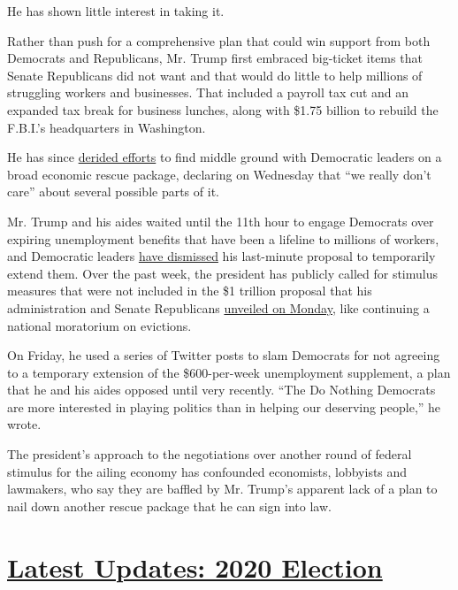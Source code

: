 He has shown little interest in taking it.

Rather than push for a comprehensive plan that could win support from
both Democrats and Republicans, Mr. Trump first embraced big-ticket
items that Senate Republicans did not want and that would do little to
help millions of struggling workers and businesses. That included a
payroll tax cut and an expanded tax break for business lunches, along
with \$1.75 billion to rebuild the F.B.I.'s headquarters in Washington.

He has since
\href{https://www.nytimes.com/2020/07/29/business/economy/virus-aid-trump.html?referringSource=articleShare}{derided
efforts} to find middle ground with Democratic leaders on a broad
economic rescue package, declaring on Wednesday that ``we really don't
care'' about several possible parts of it.

Mr. Trump and his aides waited until the 11th hour to engage Democrats
over expiring unemployment benefits that have been a lifeline to
millions of workers, and Democratic leaders
\href{https://www.nytimes.com/2020/07/30/us/politics/senate-virus-aid.html}{have
dismissed} his last-minute proposal to temporarily extend them. Over the
past week, the president has publicly called for stimulus measures that
were not included in the \$1 trillion proposal that his administration
and Senate Republicans
\href{https://www.nytimes.com/2020/07/27/us/politics/republicans-jobless-aid.html}{unveiled
on Monday}, like continuing a national moratorium on evictions.

On Friday, he used a series of Twitter posts to slam Democrats for not
agreeing to a temporary extension of the \$600-per-week unemployment
supplement, a plan that he and his aides opposed until very recently.
``The Do Nothing Democrats are more interested in playing politics than
in helping our deserving people,'' he wrote.

The president's approach to the negotiations over another round of
federal stimulus for the ailing economy has confounded economists,
lobbyists and lawmakers, who say they are baffled by Mr. Trump's
apparent lack of a plan to nail down another rescue package that he can
sign into law.

\hypertarget{latest-updates-2020-election}{%
\section{\texorpdfstring{\href{https://www.nytimes.com/2020/08/03/us/elections/biden-vs-trump.html?action=click\&pgtype=Article\&state=default\&region=MAIN_CONTENT_1\&context=storylines_live_updates}{Latest
Updates: 2020
Election}}{Latest Updates: 2020 Election}}\label{latest-updates-2020-election}}

